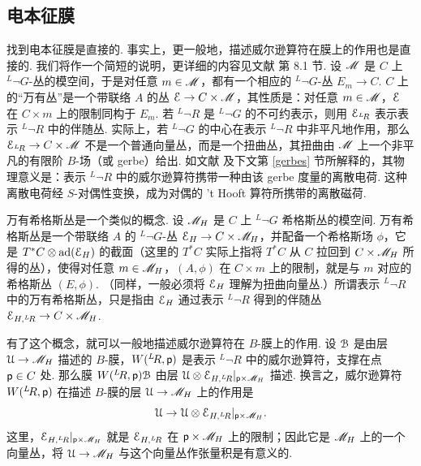 \subsection{电本征膜}\label{eleig}

找到电本征膜是直接的. 事实上，更一般地，描述威尔逊算符在膜上的作用也是直接的. 我们将作一个简短的说明，更详细的内容见文献 \cite{KW} 第 8.1 节.
设 ${\mathscr{M}}$ 是 $C$ 上 $^L\neg G$-丛的模空间，于是对任意 $m\in {\mathscr{M}}$，都有一个相应的 $^L\neg G$-丛 $E_m\to C$.
$C$ 上的“万有丛”是一个带联络 $A$ 的丛 ${\mathcal E}\to C\times {\mathscr{M}}$，其性质是：对任意 $m\in {\mathscr{M}}$，${\mathcal E}$ 在 $C\times m$ 上的限制同构于 $E_m$.
若 $^L\neg R$ 是 $^L\neg G$ 的不可约表示，则用 ${\mathcal E}_{^L\negthinspace R}$ 表示表示 $^L\neg R$ 中的伴随丛. 实际上，若 $^L\neg G$ 的中心在表示 $^L\neg R$ 中非平凡地作用，那么 ${\mathcal E}_{^L\negthinspace R}\to C\times {\mathscr{M}}$ 不是一个普通向量丛，而是一个扭曲丛，其扭曲由 ${\mathscr{M}}$ 上一个非平凡的有限阶 $B$-场（或 gerbe）给出. 如文献 \cite{KW} 及下文第 \ref{gerbes} 节所解释的，其物理意义是：表示 $^L\neg R$ 中的威尔逊算符携带一种由该 gerbe 度量的离散电荷. 这种离散电荷经 $S$-对偶性变换，成为对偶的 't Hooft 算符所携带的离散磁荷.

万有希格斯丛是一个类似的概念. 设 ${{\mathscr{M}}_H}$ 是 $C$ 上 $^L\neg G$ 希格斯丛的模空间. 万有希格斯丛是一个带联络 $A$ 的 $^L\neg G$-丛 ${\mathcal E}_H\to C\times {{\mathscr{M}}_H}$，并配备一个希格斯场 $\phi$，它是 $T^*C
\otimes \mathrm{ad}({\mathcal E}_H)$ 的截面（这里的 $T^*C$ 实际上指将 $T^*C$ 从 $C$ 拉回到 $C\times {{\mathscr{M}}_H}$ 所得的丛），使得对任意 $m\in{{\mathscr{M}}_H}$，$(A,\phi)$ 在 $C\times m$ 上的限制，就是与 $m$ 对应的希格斯丛 $(E,\phi)$.
（同样，一般必须将 ${\mathcal E}_H$ 理解为扭曲向量丛.）所谓表示 $^L\neg R$ 中的万有希格斯丛，只是指由 ${\mathcal E}_H $ 通过表示 $^L\neg R$ 得到的伴随丛 ${\mathcal E}_{H,^L\negthinspace R}\to C\times {{\mathscr{M}}_H}$.

有了这个概念，就可以一般地描述威尔逊算符在 $B$-膜上的作用. 设 ${\mathcal B}$ 是由层 ${\mathcal U}\to {{\mathscr{M}}_H}$ 描述的 $B$-膜，$W(^L\negthinspace R,{\sf p})$ 是表示 $^L\neg R$ 中的威尔逊算符，支撑在点 ${\sf p}\in C$ 处. 那么膜 $W(^L\negthinspace R,{\sf p}){\mathcal B}$ 由层 ${\mathcal U}\otimes {\mathcal E}_{H,^L\negthinspace R}|_{{\sf p}\times
{{\mathscr{M}}_H}}$ 描述. 换言之，威尔逊算符 $W(^L\negthinspace R,{\sf p})$ 在描述 $B$-膜的层 ${\mathcal U}\to {{\mathscr{M}}_H}$ 上的作用是
\begin{equation}\label{dotto}{\mathcal U}\to {\mathcal U}\otimes  {\mathcal E}_{H,^L\negthinspace R}|_{{\sf p}\times
{{\mathscr{M}}_H}}.   \end{equation} 
这里，${\mathcal E}_{H,^L\negthinspace R}|_{{\sf p}\times {{\mathscr{M}}_H}}$ 就是 ${\mathcal E}_{H,^L\negthinspace R}$ 在 ${\sf p}\times {{\mathscr{M}}_H}$ 上的限制；因此它是 ${{\mathscr{M}}_H}$ 上的一个向量丛，将 ${\mathcal U}\to {{\mathscr{M}}_H}$ 与这个向量丛作张量积是有意义的.

